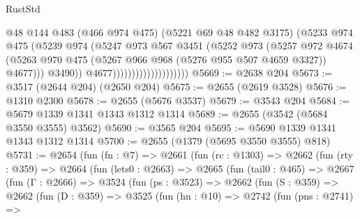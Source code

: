 \begin{lexlean}{RustStd}
\begin{coremodule}
                                          @48
                                          @144
                                          @483
                                          (@466 @974 @475)
                                          (@5221 @69 @48 @482 @3175)
                                          (@5233
                                            @974
                                            @475
                                            (@5239
                                              @974
                                              (@5247
                                                @973
                                                @567
                                                @3451
                                                (@5252
                                                  @973
                                                  (@5257
                                                    @972
                                                    @4674
                                                    (@5263
                                                      @970
                                                      @475
                                                      (@5267
                                                        @966
                                                        @968
                                                        (@5276 @955 @507 @4659 @3327))
                                                      @4677)))
                                                @3490))
                                            @4677))))))))))))))))))))
@5669 := @2638 @204
@5673 := @3517 (@2644 @204) (@2650 @204)
@5675 := @2655 (@2619 @3528)
@5676 := @1310 @2300
@5678 := @2655 (@5676 @3537)
@5679 := @3543 @204
@5684 := @5679 @1339 @1341 @1343 @1312 @1314
@5689 := @2655 (@3542 (@5684 @3550 @3555) @3562)
@5690 := @3565 @204
@5695 := @5690 @1339 @1341 @1343 @1312 @1314
@5700 := @2655 (@1379 (@5695 @3550 @3555) @818)
@5731 := @2654
    (fun (fn : @7) =>
    @2661
      (fun (rc : @1303) =>
      @2662
        (fun (rty : @359) =>
        @2664
          (fun (lets0 : @2663) =>
          @2665
            (fun (tail0 : @465) =>
            @2667
              (fun (Γ : @2666) =>
              @3524
                (fun (ps : @3523) =>
                @2662
                  (fun (S : @359) =>
                  @2662
                    (fun (D : @359) =>
                    @3525
                      (fun (hn : @10) =>
                      @2742
                        (fun (pns : @2741) =>

\end{coremodule}
\end{lexlean}
